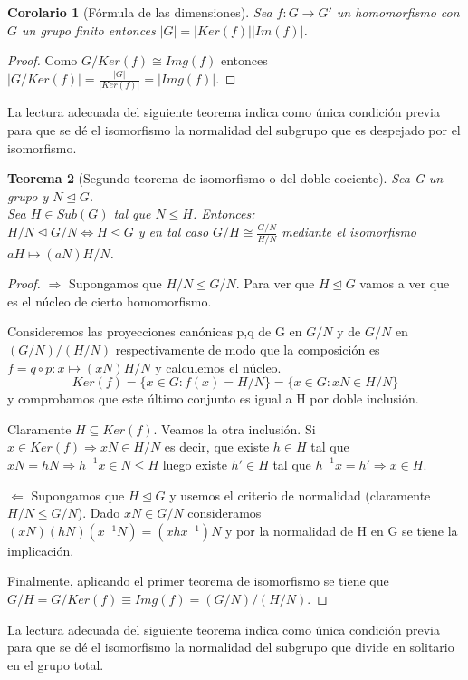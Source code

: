 \documentclass{article}
\theoremstyle{theorem-style}  %
\newtheorem{theorem}{Teorema}[section]  %
\newtheorem{corollary}[theorem]{Corolario} %
\theoremstyle{definition-style}
\theoremstyle{example-style}
\begin{document}
\begin{corollary}[Fórmula de las dimensiones]
Sea $f:G \rightarrow G'$ un homomorfismo con $G$ un grupo finito entonces $|G| = |Ker(f)||Im(f)|$.
\end{corollary}
\begin{proof}
Como $G/Ker(f) \cong Img(f)$ entonces $|G/Ker(f)| = \frac{|G|}{|Ker(f)|} = |Img(f)|$.
\end{proof}

La lectura adecuada del siguiente teorema indica como única condición previa para que se dé el isomorfismo la normalidad del subgrupo que es despejado por el isomorfismo.

\begin{theorem}[Segundo teorema de isomorfismo o del doble cociente]
Sea G un grupo y $N \trianglelefteq G$.\\ Sea $H \in Sub(G)$ tal que $N \le H$. Entonces:\\
$H/N \trianglelefteq G/N \iff H \trianglelefteq G$ y en tal caso $G/H \cong \frac{G/N}{H/N}$ mediante el isomorfismo $aH \mapsto (aN)H/N$.
\end{theorem}
\begin{proof}
$\Rightarrow$ Supongamos que $H/N \trianglelefteq G/N$. Para ver que $H \trianglelefteq G$ vamos a ver que es el núcleo de cierto homomorfismo.

Consideremos las proyecciones canónicas p,q de G en $G/N$ y de $G/N$ en $(G/N)/(H/N)$ respectivamente de modo que la composición es $f=q \circ p:x \mapsto (xN)H/N$ y calculemos el núcleo. $$Ker(f) = \{x \in G:f(x) = H/N\} = \{x \in G:xN \in H/N\}$$ y comprobamos que este último conjunto es igual a H por doble inclusión.

Claramente $H \subseteq Ker(f)$. Veamos la otra inclusión. Si $x \in Ker(f) \Rightarrow xN \in H/N$ es decir, que existe $h \in H$ tal que $xN = hN \Rightarrow h^{-1}x \in N \le H$ luego existe $h' \in H$ tal que $h^{-1}x = h' \Rightarrow x \in H$.

$\Leftarrow$ Supongamos que $H \trianglelefteq G$ y usemos el criterio de normalidad (claramente $H/N \le G/N$). Dado $xN \in G/N$ consideramos $(xN)(hN)(x^{-1}N) = (xhx^{-1})N$ y por la normalidad de H en G se tiene la implicación.

Finalmente, aplicando el primer teorema de isomorfismo se tiene que $G/H = G/Ker(f)  \equiv Img(f) = (G/N)/(H/N)$.
\end{proof}

La lectura adecuada del siguiente teorema indica como única condición previa para que se dé el isomorfismo la normalidad del subgrupo que divide en solitario en el grupo total.
\end{document}
